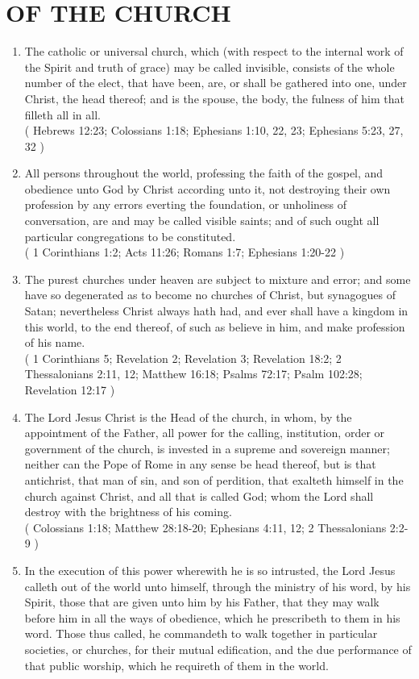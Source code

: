 \documentclass[12pt,a4paper]{book}
\begin{document}
\chapter{OF THE CHURCH}
\label{ch-chu}
\begin{enumerate}
\item
\label{ch-chu-1}
The catholic or universal church, which (with respect to the internal work of the Spirit and truth of grace) may be called invisible, consists of the whole number of the elect, that have been, are, or shall be gathered into one, under Christ, the head thereof; and is the spouse, the body, the fulness of him that filleth all in all.\\
( Hebrews 12:23; Colossians 1:18; Ephesians 1:10, 22, 23; Ephesians 5:23, 27, 32 )
\item
\label{ch-chu-2}
All persons throughout the world, professing the faith of the gospel, and obedience unto God by Christ according unto it, not destroying their own profession by any errors everting the foundation, or unholiness of conversation, are and may be called visible saints; and of such ought all particular congregations to be constituted.\\
( 1 Corinthians 1:2; Acts 11:26; Romans 1:7; Ephesians 1:20-22 )
\item
\label{ch-chu-3}
The purest churches under heaven are subject to mixture and error; and some have so degenerated as to become no churches of Christ, but synagogues of Satan; nevertheless Christ always hath had, and ever shall have a kingdom in this world, to the end thereof, of such as believe in him, and make profession of his name.\\
( 1 Corinthians 5; Revelation 2; Revelation 3; Revelation 18:2; 2 Thessalonians 2:11, 12; Matthew 16:18; Psalms 72:17; Psalm 102:28; Revelation 12:17 )
\item
The Lord Jesus Christ is the Head of the church, in whom, by the appointment of the Father, all power for the calling, institution, order or government of the church, is invested in a supreme and sovereign manner;
\label{ch-chu-4}
neither can the Pope of Rome in any sense be head thereof, but is that antichrist, that man of sin, and son of perdition, that exalteth himself in the church against Christ, and all that is called God; whom the Lord shall destroy with the brightness of his coming.\\
( Colossians 1:18; Matthew 28:18-20; Ephesians 4:11, 12; 2 Thessalonians 2:2-9 )
\item
\label{ch-chu-5}
In the execution of this power wherewith he is so intrusted, the Lord Jesus calleth out of the world unto himself, through the ministry of his word, by his Spirit, those that are given unto him by his Father, that they may walk before him in all the ways of obedience, which he prescribeth to them in his word. Those thus called, he commandeth to walk together in particular societies, or churches, for their mutual edification, and the due performance of that public worship, which he requireth of them in the world.\\

\end{enumerate}
\end{document}
